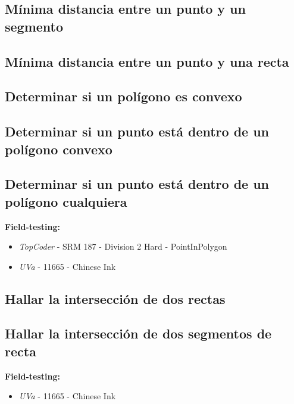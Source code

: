 \documentclass[10pt,letterpaper,twocolumn]{article}
\newcommand{\codigofuente}[1]{

\dotfill
}
\begin{document}
\subsection{Mínima distancia entre un punto y un segmento}
\codigofuente{./src/geometria/distance_point_to_segment.cpp}

\subsection{Mínima distancia entre un punto y una recta}
\codigofuente{./src/geometria/distance_point_to_line.cpp}

\subsection{Determinar si un polígono es convexo}
\codigofuente{./src/geometria/is_convex_polygon.cpp}

\subsection{Determinar si un punto está dentro de un polígono convexo}
\codigofuente{./src/geometria/is_inside_convex_polygon.cpp}

\subsection{Determinar si un punto está dentro de un polígono cualquiera}
\small
\textbf{Field-testing:}
\begin{itemize}
\item \emph{TopCoder} -  SRM 187 - Division 2 Hard - PointInPolygon
\item \emph{UVa} - 11665 - Chinese Ink
\end{itemize}
\normalsize
\codigofuente{./src/geometria/is_inside_concave_polygon.cpp}

\subsection{Hallar la intersección de dos rectas}
\codigofuente{./src/geometria/line_line_intersection.cpp}

\subsection{Hallar la intersección de dos segmentos de recta}
\label{hallar_interseccion_segmentos}
\small
\textbf{Field-testing:}
\begin{itemize}
\item \emph{UVa} - 11665 - Chinese Ink
\end{itemize}
\normalsize
\end{document}
